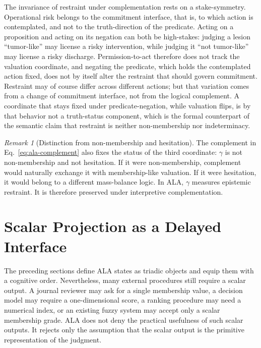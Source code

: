 \documentclass[reqno,final]{amsart}
\theoremstyle{definition}
\theoremstyle{plain}
\theoremstyle{remark}
\newtheorem{remark}{Remark}
\begin{document}
The invariance of restraint under complementation rests on a stake-symmetry. Operational risk belongs to the commitment interface, that is, to which action is contemplated, and not to the truth-direction of the predicate. Acting on a proposition and acting on its negation can both be high-stakes: judging a lesion ``tumor-like'' may license a risky intervention, while judging it ``not tumor-like'' may license a risky discharge. Permission-to-act therefore does not track the valuation coordinate, and negating the predicate, which holds the contemplated action fixed, does not by itself alter the restraint that should govern commitment. Restraint may of course differ across different actions; but that variation comes from a change of commitment interface, not from the logical complement. A coordinate that stays fixed under predicate-negation, while valuation flips, is by that behavior not a truth-status component, which is the formal counterpart of the semantic claim that restraint is neither non-membership nor indeterminacy.

\begin{remark}[Distinction from non-membership and hesitation]
The complement in Eq.~\eqref{eq:ala-complement} also fixes the status of the third coordinate: \(\gamma\) is not non-membership and not hesitation. If it were non-membership, complement would naturally exchange it with membership-like valuation. If it were hesitation, it would belong to a different mass-balance logic. In ALA, \(\gamma\) measures epistemic restraint. It is therefore preserved under interpretive complementation.
\end{remark}

\section{Scalar Projection as a Delayed Interface}
\label{sec:scalar-projection}

The preceding sections define ALA states as triadic objects and equip them with a cognitive order. Nevertheless, many external procedures still require a scalar output. A journal reviewer may ask for a single membership value, a decision model may require a one-dimensional score, a ranking procedure may need a numerical index, or an existing fuzzy system may accept only a scalar membership grade. ALA does not deny the practical usefulness of such scalar outputs. It rejects only the assumption that the scalar output is the primitive representation of the judgment.
\end{document}
